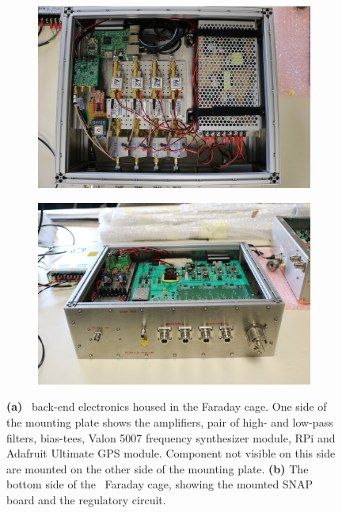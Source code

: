 \begin{figure}
	\centering
	\begin{subfigure}[t]{0.52\textwidth}
		\centering
		\includegraphics[width=\linewidth]{Figures/47093126504_fa0061a85b_o} 
		\caption{} \label{Fig:47093126504_fa0061a85b_o}
	\end{subfigure}
	\hfill
	\begin{subfigure}[t]{0.47\textwidth}
		\centering
		\includegraphics[width=\linewidth]{Figures/47093128324_04792aa5c5_o}
		\caption{} \label{Fig:47093128324_04792aa5c5_o}
	\end{subfigure}
	\caption{{\bf (a)} \albatros\ back-end electronics housed in the Faraday cage. One side of the mounting plate  shows the amplifiers, pair of high- and low-pass filters, bias-tees, Valon 5007 frequency synthesizer module, RPi and Adafruit Ultimate GPS module. Component not visible on this side are mounted on the other side of the mounting plate. {\bf (b)} The bottom side of the \albatros\ Faraday cage, showing the mounted SNAP board and the regulatory circuit.} \label{Fig:faraday1}
\end{figure}

